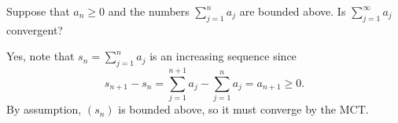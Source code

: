 \documentclass[11pt,dvipsnames]{book}
\numberwithin{figure}{section} %
\numberwithin{table}{section} %
\begin{document}
\begin{exercise}
Suppose that $a_{n}\geq 0$ and the numbers $\sum_{j=1}^{n}a_{j}$ are bounded above.  Is $\sum_{j=1}^{\infty}a_{j}$ convergent?

\begin{solution}
Yes, note that $s_n=\sum_{j=1}^{n}a_{j}$ is an increasing sequence since
\[
s_{n+1}-s_{n}=\sum_{j=1}^{n+1}a_{j}-\sum_{j=1}^{n}a_{j} = a_{n+1}\geq 0.
\]
By assumption, $(s_{n})$ is bounded above, so it must converge by the MCT.
\end{solution}
\end{exercise}

%
%
%
%
\end{document}
